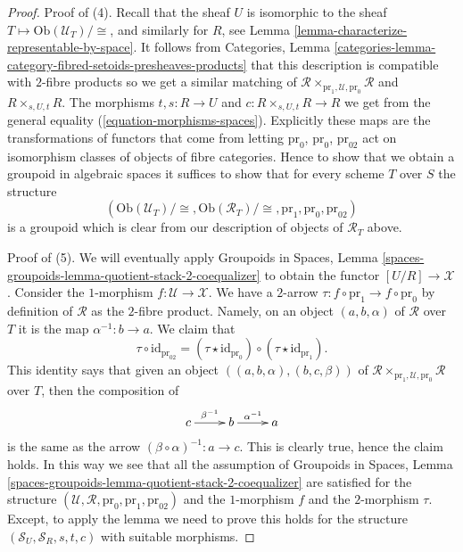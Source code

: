 \begin{proof}
\medskip\noindent
Proof of (4). Recall that the sheaf $U$ is isomorphic to the sheaf
$T \mapsto \text{Ob}(\mathcal{U}_T)/\!\cong$, and
similarly for $R$, see
Lemma \ref{lemma-characterize-representable-by-space}.
It follows from
Categories,
Lemma \ref{categories-lemma-category-fibred-setoids-presheaves-products}
that this description is compatible with $2$-fibre products
so we get a similar matching of
$\mathcal{R} \times_{\text{pr}_1, \mathcal{U}, \text{pr}_0} \mathcal{R}$
and $R \times_{s, U, t} R$.
The morphisms $t, s : R \to U$ and $c : R \times_{s, U, t} R \to R$
we get from the general equality (\ref{equation-morphisms-spaces}).
Explicitly these maps are the transformations of functors that come
from letting $\text{pr}_0$, $\text{pr}_0$, $\text{pr}_{02}$
act on isomorphism classes of objects of fibre categories.
Hence to show that we obtain a groupoid in algebraic
spaces it suffices to show that for every scheme $T$ over $S$
the structure
$$
(\text{Ob}(\mathcal{U}_T)/\!\cong,
\text{Ob}(\mathcal{R}_T)/\!\cong,
\text{pr}_1, \text{pr}_0, \text{pr}_{02})
$$
is a groupoid which is clear from our description of objects of
$\mathcal{R}_T$ above.

\medskip\noindent
Proof of (5). We will eventually apply
Groupoids in Spaces,
Lemma \ref{spaces-groupoids-lemma-quotient-stack-2-coequalizer}
to obtain the functor $[U/R] \to \mathcal{X}$.
Consider the $1$-morphism $f : \mathcal{U} \to \mathcal{X}$.
We have a $2$-arrow $\tau : f \circ \text{pr}_1 \to f \circ \text{pr}_0$
by definition of $\mathcal{R}$ as the $2$-fibre product.
Namely, on an object $(a, b, \alpha)$ of $\mathcal{R}$ over $T$ it is
the map $\alpha^{-1} : b \to a$. We claim that
$$
\tau \circ \text{id}_{\text{pr}_{02}} = 
(\tau \star \text{id}_{\text{pr}_0})
\circ
(\tau \star \text{id}_{\text{pr}_1}).
$$
This identity says that given an object
$((a, b, \alpha), (b, c, \beta))$ of
$\mathcal{R} \times_{\text{pr}_1, \mathcal{U}, \text{pr}_0} \mathcal{R}$
over $T$, then the composition of
$$
\xymatrix{
c \ar[r]^{\beta^{-1}} & b \ar[r]^{\alpha^{-1}} & a
}
$$
is the same as the arrow $(\beta \circ \alpha)^{-1} : a \to c$. This is
clearly true, hence the claim holds. In this way we see that all the
assumption of
Groupoids in Spaces,
Lemma \ref{spaces-groupoids-lemma-quotient-stack-2-coequalizer}
are satisfied for the structure
$(\mathcal{U}, \mathcal{R}, \text{pr}_0, \text{pr}_1, \text{pr}_{02})$
and the $1$-morphism $f$ and the $2$-morphism $\tau$.
Except, to apply the lemma we need to prove this holds
for the structure $(\mathcal{S}_U, \mathcal{S}_R, s, t, c)$
with suitable morphisms.


\end{proof}

